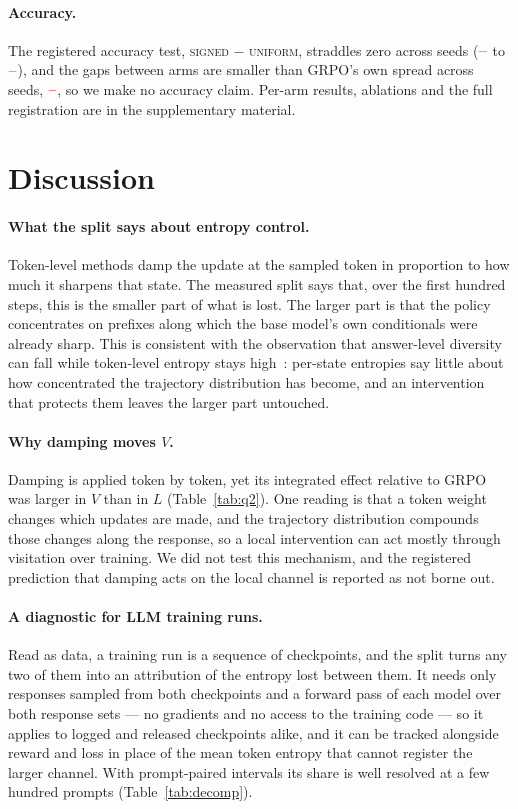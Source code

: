 \documentclass[runningheads]{llncs}
\providecommand{\PENDING}{\textcolor{red}{\textbf{--}}}
\newcommand{\num}[1]{\ifcsname #1\endcsname\csname #1\endcsname\else\PENDING\fi}
\begin{document}
\paragraph{Accuracy.} The registered accuracy test, \textsc{signed} $-$
\textsc{uniform}, straddles zero across seeds ($\num{CLosigneduniformacc}$ to
$\num{CHisigneduniformacc}$), and the gaps between arms are smaller than GRPO's own
spread across seeds, $\num{Sgrpoacc}$, so we make no accuracy claim. Per-arm results,
ablations and the full registration are in the supplementary material.

\section{Discussion}
\label{sec:discussion}

\paragraph{What the split says about entropy control.} Token-level methods damp the
update at the sampled token in proportion to how much it sharpens that state. The
measured split says that, over the first hundred steps, this is the smaller part of
what is lost. The larger part is that the policy concentrates on prefixes along which
the base model's own conditionals were already sharp. This is consistent with the
observation that answer-level diversity can fall while token-level entropy stays
high~\cite{wu2025ainvisible}: per-state entropies say little about how concentrated the
trajectory distribution has become, and an intervention that protects them leaves the
larger part untouched.

\paragraph{Why damping moves $V$.} Damping is applied token by token, yet its
integrated effect relative to GRPO was larger in $V$ than in $L$ (Table~\ref{tab:q2}).
One reading is that a token weight changes which updates are made, and the trajectory
distribution compounds those changes along the response, so a local intervention can
act mostly through visitation over training. We did not test this mechanism, and the
registered prediction that damping acts on the local channel is reported as not borne
out.

\paragraph{A diagnostic for LLM training runs.} Read as data, a training run is a
sequence of checkpoints, and the split turns any two of them into an attribution of the
entropy lost between them. It needs only responses sampled from both checkpoints and a
forward pass of each model over both response sets --- no gradients and no access to the
training code --- so it applies to logged and released checkpoints alike, and it can be
tracked alongside reward and loss in place of the mean token entropy that cannot
register the larger channel. With prompt-paired intervals its share is well resolved at
a few hundred prompts (Table~\ref{tab:decomp}).
\end{document}
